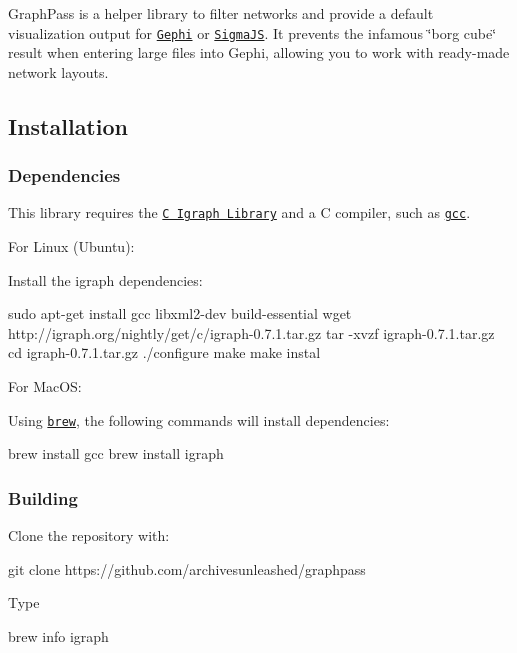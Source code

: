 

Graph\+Pass is a helper library to filter networks and provide a default visualization output for \href{https://gephi.org/}{\tt Gephi} or \href{https://sigmaja.org}{\tt Sigma\+JS}. It prevents the infamous \char`\"{}borg cube\char`\"{} result when entering large files into Gephi, allowing you to work with ready-\/made network layouts.

\subsection*{Installation}

\subsubsection*{Dependencies}

This library requires the \href{http://igraph.org/c/}{\tt C Igraph Library} and a C compiler, such as \href{https://gcc.gnu.org/}{\tt gcc}.

For Linux (Ubuntu)\+:

Install the igraph dependencies\+:


\begin{DoxyCode}
sudo apt-get install gcc libxml2-dev build-essential
wget http://igraph.org/nightly/get/c/igraph-0.7.1.tar.gz
tar -xvzf igraph-0.7.1.tar.gz
cd igraph-0.7.1.tar.gz
./configure
make
make instal
\end{DoxyCode}


For Mac\+OS\+:

Using \href{https://brew.sh/}{\tt brew}, the following commands will install dependencies\+:


\begin{DoxyCode}
brew install gcc
brew install igraph
\end{DoxyCode}


\subsubsection*{Building}

Clone the repository with\+:


\begin{DoxyCode}
git clone https://github.com/archivesunleashed/graphpass
\end{DoxyCode}


Type


\begin{DoxyCode}
brew info igraph
\end{DoxyCode}


